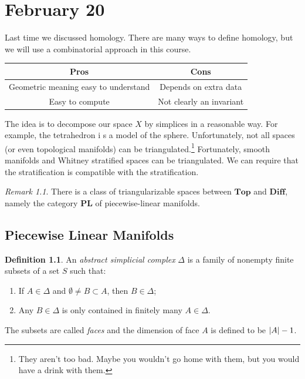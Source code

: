 \documentclass[leqno, openany]{memoir}
\theoremstyle{definition}
\newtheorem{defn}[thm]{Definition}
\theoremstyle{remark}
\newtheorem{rmk}[thm]{Remark}
\theoremstyle{plain}
\theoremstyle{definition}
\theoremstyle{remark}
\begin{document}
\chapter{February 20}%
\label{cha:february_20}

Last time we discussed homology. There are many ways to define homology, but we will use a combinatorial approach in this course.

\begin{center}
    \begin{tabular}{cc}
        \toprule
        Pros & Cons \\
        \midrule
        Geometric meaning easy to understand & Depends on extra data \\
        Easy to compute & Not clearly an invariant \\
        \bottomrule
    \end{tabular}
\end{center}
The idea is to decompose our space $X$ by simplices in a reasonable way. For example, the tetrahedron i s a model of the sphere. Unfortunately, not all spaces (or even topological manifolds) can be triangulated.\footnote{They aren't too bad. Maybe you wouldn't go home with them, but you would have a drink with them.} Fortunately, smooth manifolds and Whitney stratified spaces can be triangulated. We can require that the stratification is compatible with the stratification.

\begin{rmk}
    There is a class of triangularizable spaces between $\mathbf{Top}$ and $\mathbf{Diff}$, namely the category $\mathbf{PL}$ of piecewise-linear manifolds.
\end{rmk}

\section{Piecewise Linear Manifolds}%
\label{sec:piecewise_linear_manifolds}

\begin{defn}
    An \textit{abstract simplicial complex} $\Delta$ is a family of nonempty finite subsets of a set $S$ such that:
    \begin{enumerate}
        \item If $A \in \Delta$ and $\emptyset \neq B \subset A$, then $B \in \Delta$;
        \item Any $B \in \Delta$ is only contained in finitely many $A \in \Delta$.
    \end{enumerate}
    The subsets are called \textit{faces} and the dimension of face $A$ is defined to be $\abs{A} - 1$.
\end{defn}
\end{document}
